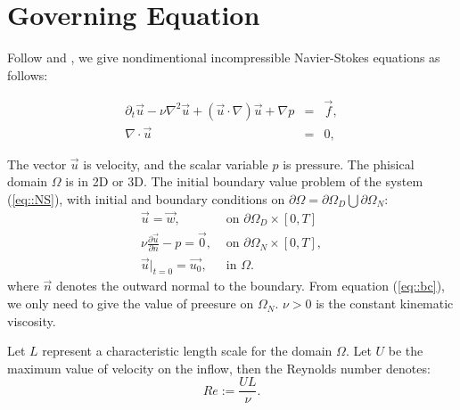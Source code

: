 \documentclass[a4paper, 11pt]{article}
\begin{document}
\section{Governing Equation}

    Follow \cite{popiolek2006numerical} and \cite{elman2005finite}, we
    give nondimentional incompressible Navier-Stokes equations as
    follows:
    
    \begin{equation}
      \begin{array}{rcl}
         \partial_t \vec{u} - \nu \nabla^2 \vec{u} +
        (\vec{u} \cdot \nabla )\vec{u} + \nabla p & =
        & \vec{f},\\
        \nabla \cdot \vec{u} & = & 0,
      \end{array}
      \label{eq::NS}
    \end{equation}

    The vector $\vec{u}$ is velocity, and the scalar
    variable $p$ is pressure. The phisical domain $\Omega$ is in 2D or
    3D. The initial boundary value problem of the system
    (\ref{eq::NS}), with initial and boundary conditions on $\partial
    \Omega = \partial \Omega_D \bigcup \partial \Omega_N$:
    \begin{equation}
      \begin{array}{ll}
        \vec{u} = \vec{w},& \mbox{ on } \partial \Omega_D \times [0,
        T]\\
        \nu \displaystyle \frac{\partial \vec{u}}{\partial n} - p =
        \vec{0}, & \mbox{ on } \partial \Omega_N \times [0, T],  \\
        \vec{u}|_{t = 0} = \vec{u_0}, & \mbox{ in } \Omega. 
      \end{array}
      \label{eq::bc}
    \end{equation} 
    where $\vec{n}$ denotes the outward normal to the boundary. From
    equation (\ref{eq::bc}), we only need to give the value of
    preesure on $\Omega_N$. $\nu > 0$ is the constant kinematic
    viscosity.  

    Let $L$ represent a characteristic length scale for the domain
    $\Omega$. Let $U$ be the maximum value of velocity on the inflow,
    then the Reynolds number denotes:
    \begin{equation}
      Re := \frac{UL}{\nu}.
    \end{equation}
    
\end{document}
